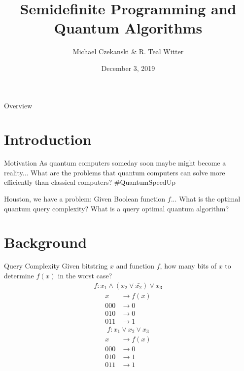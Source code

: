 \documentclass[12pt]{beamer}
\title{Semidefinite Programming and Quantum Algorithms}
\author{Michael Czekanski \& R. Teal Witter}
\institute{Middlebury College}
\date{December 3, 2019}
\begin{document}
\graphicspath{{./../figures/}}

\frame{\titlepage}

\begin{frame}{Overview}
\setcounter{tocdepth}{1}
\tableofcontents
\end{frame}

\section{Introduction}
\begin{frame}{Motivation}
As quantum computers someday soon maybe might become a reality...
\newline
\newline
What are the problems that quantum computers 
can solve more efficiently
than classical computers? \#QuantumSpeedUp

\end{frame}

\begin{frame}{Houston, we have a problem:}
Given Boolean function $f$...
\newline
\newline
What is the optimal quantum query complexity?
\newline
\newline
What is a query optimal quantum algorithm?
\end{frame}

\section{Background}
\begin{frame}{Query Complexity}
Given bitstring $x$ and function $f$,
how many bits of $x$ to determine $f(x)$ in the worst case?
{
\begin{align}
 f: x_1 \wedge (x_2 \vee \bar{x_2}) \vee x_3 \nonumber
\end{align}
}
{
\begin{align}
x &\rightarrow f(x) \nonumber \\
000 &\rightarrow 0 \nonumber \\
010 &\rightarrow 0 \nonumber \\
011 &\rightarrow 1 \nonumber
\end{align}
}
{
\begin{align}
 f: x_1 \vee x_2 \vee x_3 \nonumber
\end{align}
}
{
\begin{align}
x &\rightarrow f(x) \nonumber \\
000 &\rightarrow 0 \nonumber \\
010 &\rightarrow 1 \nonumber \\
011 &\rightarrow 1 \nonumber
\end{align}
}
\end{frame}
\end{document}
